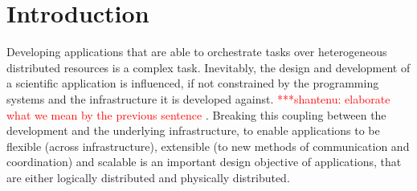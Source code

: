 \documentclass{rspublic}
\newcommand{\jhanote}[1]{ {\textcolor{red} { ***shantenu: #1 }}}
\newcommand{\jhanote}[1]{}
\begin{document}
\begin{abstract}{Replica-Exchange, SAGA, Large-Scale, Production}

\end{abstract}

\section{Introduction}
Developing applications that are able to orchestrate tasks over
heterogeneous distributed resources is a complex task.  Inevitably,
the design and development of a scientific application is influenced,
if not constrained by the programming systems and the infrastructure
it is developed against. \jhanote{elaborate what we mean by the
  previous sentence}.  Breaking this coupling between the development
and the underlying infrastructure, to enable applications to be
flexible (across infrastructure), extensible (to new methods of
communication and coordination) and scalable is an important design
objective of applications, that are either logically distributed and
physically distributed.
\end{document}

